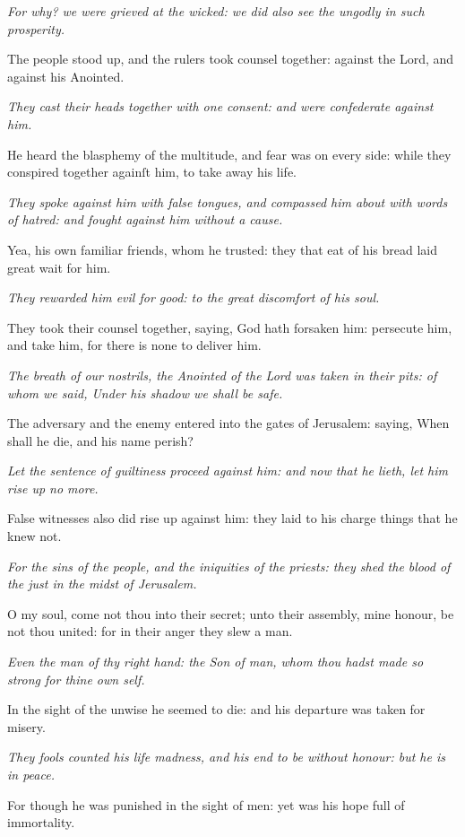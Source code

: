 \textit{For why? we were grieved at the wicked: we did also see the ungodly in such prosperity.}

The people stood up, and the rulers took counsel together: against the Lord, and against his Anointed.

\textit{They cast their heads together with one consent: and were confederate against him.}

He heard the blasphemy of the multitude, and fear was on every side: while they conspired together againſt him, to take away his life.

\textit{They spoke against him with false tongues, and compassed him about with words of hatred: and fought against him without a cause.}

Yea, his own familiar friends, whom he trusted: they that eat of his bread laid great wait for him.

\textit{They rewarded him evil for good: to the great discomfort of his
soul.}

They took their counsel together, saying, God hath forsaken him: persecute him, and take him, for there is none to deliver him.

\textit{The breath of our nostrils, the Anointed of the Lord was taken in their pits: of whom we said, Under his shadow we shall be safe.}

The adversary and the enemy entered into the gates of Jerusalem: saying, When shall he die, and his name perish?

\textit{Let the sentence of guiltiness proceed against him: and now that he lieth, let him rise up no more.}

False witnesses also did rise up against him: they laid to his charge things that he knew not.

\textit{For the sins of the people, and the iniquities of the priests: they shed the blood of the just in the midst of Jerusalem.}

O my soul, come not thou into their secret; unto their assembly, mine honour, be not thou united: for in their anger they slew a man.

\textit{Even the man of thy right hand: the Son of man, whom thou hadst made so strong for thine own self.}

In the sight of the unwise he seemed to die: and his departure was taken for misery.

\textit{They fools counted his life madness, and his end to be without honour: but he is in peace.}

For though he was punished in the sight of men: yet was his hope full of immortality.

